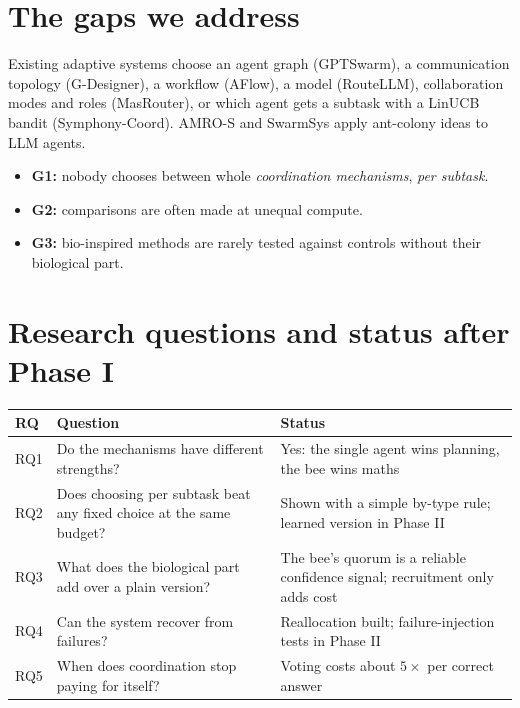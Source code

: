 \documentclass[11pt,a4paper]{article}
\begin{document}
\section{The gaps we address}
Existing adaptive systems choose an agent graph (GPTSwarm), a communication topology (G-Designer), a
workflow (AFlow), a model (RouteLLM), collaboration modes and roles (MasRouter), or which agent gets a
subtask with a LinUCB bandit (Symphony-Coord). AMRO-S and SwarmSys apply ant-colony ideas to LLM agents.
\begin{itemize}
  \item \textbf{G1:} nobody chooses between whole \emph{coordination mechanisms}, \emph{per subtask}.
  \item \textbf{G2:} comparisons are often made at unequal compute.
  \item \textbf{G3:} bio-inspired methods are rarely tested against controls without their biological part.
\end{itemize}

\section{Research questions and status after Phase I}
\begin{tabularx}{\linewidth}{@{}p{1.0cm}p{6.2cm}L@{}}
\toprule
\textbf{RQ} & \textbf{Question} & \textbf{Status} \\
\midrule
RQ1 & Do the mechanisms have different strengths? & Yes: the single agent wins planning, the bee wins maths \\
RQ2 & Does choosing per subtask beat any fixed choice at the same budget? & Shown with a simple by-type rule; learned version in Phase II \\
RQ3 & What does the biological part add over a plain version? & The bee's quorum is a reliable confidence signal; recruitment only adds cost \\
RQ4 & Can the system recover from failures? & Reallocation built; failure-injection tests in Phase II \\
RQ5 & When does coordination stop paying for itself? & Voting costs about $5\times$ per correct answer \\
\bottomrule
\end{tabularx}
\end{document}
